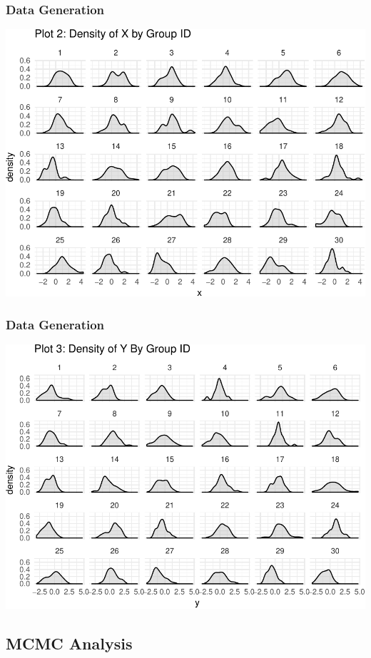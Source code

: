 \documentclass{beamer}
\begin{document}
\begin{frame}
	
\frametitle{Data Generation}
\includegraphics[scale=.75]{Raw_density_x.pdf}

\end{frame}

\begin{frame}
\frametitle{Data Generation}
\includegraphics[scale=.75]{Raw_density_y.pdf}
\end{frame}

\subsection{MCMC Analysis}
\end{document}
